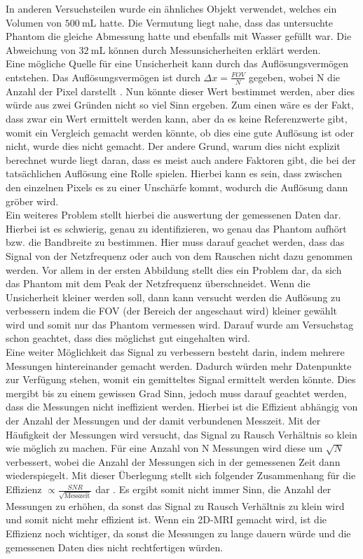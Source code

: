 In anderen Versuchsteilen wurde ein ähnliches Objekt verwendet, welches ein Volumen von $\SI{500}{\milli \liter}$ hatte. Die Vermutung liegt nahe, dass das untersuchte Phantom die gleiche Abmessung hatte und ebenfalls mit Wasser gefüllt war. Die Abweichung von $\SI{32}{\milli\liter}$ können durch Messunsicherheiten erklärt werden.\\
Eine mögliche Quelle für eine Unsicherheit kann durch das Auflösungsvermögen entstehen. Das Auflösungsvermögen ist durch $\Delta x=\frac{FOV}{N}$ gegeben, wobei N die Anzahl der Pixel darstellt \cite{Schmidt}. Nun könnte dieser Wert bestimmet werden, aber dies würde aus zwei Gründen nicht so viel Sinn ergeben. Zum einen wäre es der Fakt, dass zwar ein Wert ermittelt werden kann, aber da es keine Referenzwerte gibt, womit ein Vergleich gemacht werden könnte, ob dies eine gute Auflösung ist oder nicht, wurde dies nicht gemacht. Der andere Grund, warum dies nicht explizit berechnet wurde liegt daran, dass es meist auch andere Faktoren gibt, die bei der tatsächlichen Auflösung eine Rolle spielen. Hierbei kann es sein, dass zwischen den einzelnen Pixels es zu einer Unschärfe kommt, wodurch die Auflösung dann gröber wird.\\
Ein weiteres Problem stellt hierbei die auswertung der gemessenen Daten dar. Hierbei ist es schwierig, genau zu identifizieren, wo genau das Phantom aufhört bzw. die Bandbreite zu bestimmen. Hier muss darauf geachet werden, dass das Signal von der Netzfrequenz oder auch von dem Rauschen nicht dazu genommen werden. Vor allem in der ersten Abbildung stellt dies ein Problem dar, da sich das Phantom mit dem Peak der Netzfrequenz überschneidet.
Wenn die Unsicherheit kleiner werden soll, dann kann versucht werden die Auflösung zu verbessern indem die FOV (der Bereich der angeschaut wird) kleiner gewählt wird und somit nur das Phantom vermessen wird. Darauf wurde am Versuchstag schon geachtet, dass dies möglichst gut eingehalten wird. \\
Eine weiter Möglichkeit das Signal zu verbessern besteht darin, indem mehrere Messungen hintereinander gemacht werden. Dadurch würden mehr Datenpunkte zur Verfügung stehen, womit ein gemitteltes Signal ermittelt werden könnte. Dies mergibt bis zu einem gewissen Grad Sinn, jedoch muss darauf geachtet werden, dass die Messungen nicht \glqq ineffizient\grqq{} werden. Hierbei ist die Effizient abhängig von der Anzahl der Messungen und der damit verbundenen Messzeit. Mit der Häufigkeit der Messungen wird versucht, das Signal zu Rausch Verhältnis so klein wie möglich zu machen. Für eine Anzahl von N Messungen wird diese um $\sqrt{N}$ verbessert, wobei die Anzahl der Messungen sich in der gemessenen Zeit dann wiederspiegelt. Mit dieser Überlegung stellt sich folgender Zusammenhang für die Effizienz $\propto\frac{SNR}{\sqrt{\text{Messzeit}}}$ dar \cite{Schmidt}. Es ergibt somit nicht immer Sinn, die Anzahl der Messungen zu erhöhen, da sonst das Signal zu Rausch Verhältnis zu klein wird und somit nicht mehr effizient ist.
Wenn ein 2D-MRI gemacht wird, ist die Effizienz noch wichtiger, da sonst die Messungen zu lange dauern würde und die gemessenen Daten dies nicht rechtfertigen würden. 